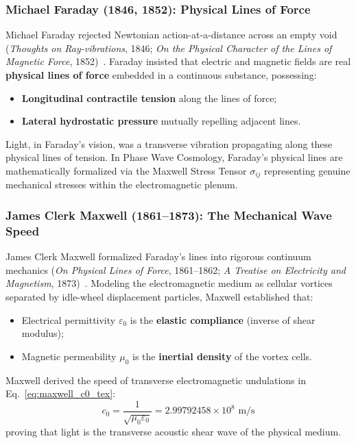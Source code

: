 \documentclass[11pt,a4paper]{article}
\begin{document}
\subsubsection{Michael Faraday (1846, 1852): Physical Lines of Force}
\label{subsubsec:faraday_lines}

Michael Faraday rejected Newtonian action-at-a-distance across an empty void (\textit{Thoughts on Ray-vibrations}, 1846; \textit{On the Physical Character of the Lines of Magnetic Force}, 1852)~\cite{Faraday1846,Faraday1852}. Faraday insisted that electric and magnetic fields are real \textbf{physical lines of force} embedded in a continuous substance, possessing:
\begin{itemize}
    \item \textbf{Longitudinal contractile tension} along the lines of force;
    \item \textbf{Lateral hydrostatic pressure} mutually repelling adjacent lines.
\end{itemize}
Light, in Faraday's vision, was a transverse vibration propagating along these physical lines of tension. In Phase Wave Cosmology, Faraday's physical lines are mathematically formalized via the Maxwell Stress Tensor $\sigma_{ij}$ representing genuine mechanical stresses within the electromagnetic plenum.

\subsubsection{James Clerk Maxwell (1861--1873): The Mechanical Wave Speed}
\label{subsubsec:maxwell_wavespeed}

James Clerk Maxwell formalized Faraday's lines into rigorous continuum mechanics (\textit{On Physical Lines of Force}, 1861--1862; \textit{A Treatise on Electricity and Magnetism}, 1873)~\cite{Maxwell1861,Maxwell1873}. Modeling the electromagnetic medium as cellular vortices separated by idle-wheel displacement particles, Maxwell established that:
\begin{itemize}
    \item Electrical permittivity $\varepsilon_0$ is the \textbf{elastic compliance} (inverse of shear modulus);
    \item Magnetic permeability $\mu_0$ is the \textbf{inertial density} of the vortex cells.
\end{itemize}
Maxwell derived the speed of transverse electromagnetic undulations in Eq.~\eqref{eq:maxwell_c0_tex}:
\begin{equation}
c_0 = \frac{1}{\sqrt{\mu_0 \varepsilon_0}} = 2.99792458 \times 10^8\text{ m/s}
\label{eq:maxwell_c0_tex}
\end{equation}
proving that light is the transverse acoustic shear wave of the physical medium.
\end{document}
